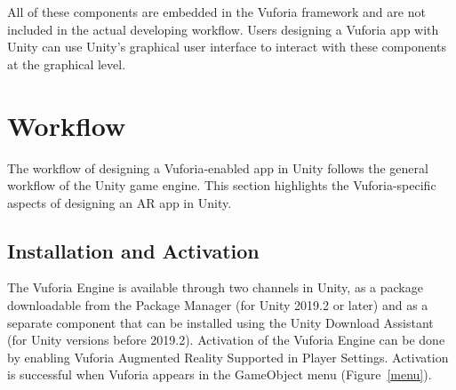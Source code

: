 All of these components are embedded in the Vuforia framework and are not included in the actual developing workflow. Users designing a Vuforia app with Unity can use Unity's graphical user interface to interact with these components at the graphical level.

\section{Workflow}\label{workflow}
The workflow of designing a Vuforia-enabled app in Unity follows the general workflow of the Unity game engine. This section highlights the Vuforia-specific aspects of designing an AR app in Unity.
\subsection{Installation and Activation}
The Vuforia Engine is available through two channels in Unity, as a package downloadable from the Package Manager (for Unity 2019.2 or later) and as a separate component that can be installed using the Unity Download Assistant (for Unity versions before 2019.2). Activation of the Vuforia Engine can be done by enabling Vuforia Augmented Reality Supported in Player Settings. Activation is successful when Vuforia appears in the GameObject menu (Figure~\ref{menu}).

\begin{figure}[!ht]
\end{figure}


